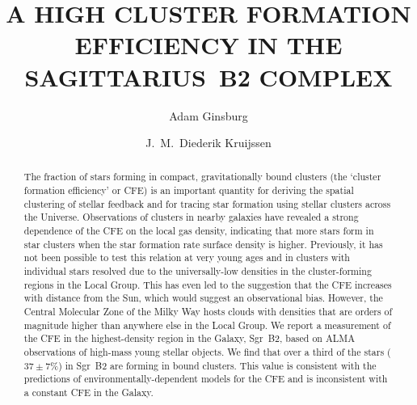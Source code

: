 \documentclass[twocolumn]{aastex62}
\begin{document}
\title{A HIGH CLUSTER FORMATION EFFICIENCY IN THE SAGITTARIUS~B2 COMPLEX}


\author[0000-0001-6431-9633]{Adam Ginsburg}

\author[0000-0002-8804-0212]{J.~M.\ Diederik Kruijssen}



\begin{abstract}
    The fraction of stars forming in compact, gravitationally bound clusters
    (the `cluster formation efficiency' or CFE) is an important quantity for
    deriving the spatial clustering of stellar feedback and for tracing star
    formation using stellar clusters across the Universe.  Observations of
    clusters in nearby galaxies have revealed a strong dependence of the CFE on
    the local gas density, indicating that more stars form in star clusters
    when the star formation rate surface density is higher. Previously, it has
    not been possible to test this relation at very young ages and in clusters
    with individual stars resolved due to the universally-low densities in the
    cluster-forming regions in the Local Group. This has even led to the
    suggestion that the CFE increases with distance from the Sun, which would
    suggest an observational bias.  However, the Central Molecular Zone of the
    Milky Way hosts clouds with densities that are orders of magnitude higher
    than anywhere else in the Local Group.  We report a measurement of the CFE
    in the highest-density region in the Galaxy, Sgr~B2, based on ALMA
    observations of high-mass young stellar objects.  We find that over a
    third of the stars ($37\pm7\%$)  in Sgr~B2 are forming in bound clusters.
    This value is consistent with the predictions of environmentally-dependent
    models for the CFE and is inconsistent with a constant CFE in the
    Galaxy.
    \vspace{10mm}
\end{abstract}
\end{document}
